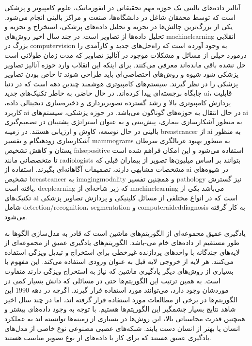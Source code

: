 آنالیز داده‌های بالینی یک حوزه مهم تحقیقاتی در انفورماتیک، علوم کامپیوتر و پزشکی است که توسط محققان شاغل در دانشگاه‌ها، صنعت و مراکز بالینی انجام می‌شود. یکی از بزرگ‌ترین چالش‌ها در تجزیه و تحلیل داده‌های پزشکی، استخراج و تجزیه و تحلیل داده‌ها از تصاویر است. در چند سال اخیر روش‌های \gls{machinelearning} انقلابی بزرگ در \gls{computervision} به وجود آورده است که راه‌حل‌های جدید و کارآمدی را درمورد خیلی از مسائل و مشکلات موجود در آنالیز تصاویر که مدت زمان طولانی است حل نشده باقی مانده‌اند معرفی می‌کنند. برای اینکه این انقلاب وارد حوزه آنالیز تصاویر پزشکی شود شیوه و روش‌های اختصاصی‌ای باید طراحی شوند تا خاص بودن تصاویر پزشکی را در نظر گیرند. سیستم‌های کامپیوتری هوشمند چندین دهه است که در دنیا جایگاه برجسته‌ای پیدا کرده‌اند. در حال حاضر، به خاطر تکنیک‌های جدید \gls{ai}، قابلیت پردازش کامپیوتری بالا و رشد گسترده تصویربرداری و ذخیره‌سازی دیجیتالی داده، کاربرد \gls{ai} در حال انتقال به حوزه‌های گوناگون می‌باشد. در حوزه پزشکی، سیستم‌های \gls{ai} به منظور آشکارسازی بیماری، پیش‌بینی و به عنوان استراتژی پشتیبان در تصمیم‌گیری بالینی در حال توسعه، کاوش و ارزیابی هستند. در زمینه \gls{breastcancer} از \gls{ai} به منظور آشکارسازی زودهنگام و تفسیر \glspl{mammogram} به منظور بهبود غربالگری سرطان پستان و کاهش تشخیص \gls{falsepositive} استفاده می‌شود و این امکان فراهم شده است تا متخصصانی مانند \glspl{radiologist} بتوانند بر اساس میلیون‌ها تصویر از بیماران قبلی که مشخصات مشابهی دارند، تصمیمات آگاهانه‌ای بگیرند. استفاده از \gls{ai} در شیوه‌های تشخیص \gls{breastcancer} به \gls{imagingmodality} و همچنین تفسیر \gls{pathology} نیز گسترش یافته است. \gls{deeplearning} که زیر شاخه‌ای از \gls{machinelearning} می‌باشد یکی از تکنیک‌های \gls{ai} است که در انواع مختلفی از مسائل کلینیکی و پردازش تصاویر پزشکی شامل \gls{detection}/\gls{recognition}، \gls{segmentation} و \gls{computeraideddiagnosis} به کار گرفته می‌شود.

یادگیری عمیق مجموعه‌ای از الگوریتم‌های ماشین است که قادر به مدل‌سازی الگوها به طور مستقیم از داده‌های خام می-باشد. الگوریتم‌های یادگیری عمیق از مجموعه‌ای از لایه‌های چندگانه با واحدهای پردازنده غیرخطی برای استخراج و تبدیل ویژگی استفاده می‌کنند. هر لایه از خروجی لایه قبل به عنوان ورودی استفاده می‌کند. این مفهوم با بسیاری از روش‌های دیگر یادگیری ماشین که نیاز به استخراج ویژگی دارند متفاوت است. به همین ترتیب این الگوریتم‌ها حتی در مسائلی که دانش بسیار کمی در موردشان وجود دارد، می‌توانند مورد استفاده قرار گیرند. اگرچه در دهه 1990 این الگوریتم‌ها در برخی از مطالعات مورد استفاده قرار گرفته اند، اما در چند سال اخیر شاهد نتایج بسیار چشمگیر این الگوریتم‌ها هستیم. با توجه به وجود داده‌های بیشتر و همچنین قدرت محاسباتی بالا، این روش‌ها در بسیاری از زمینه‌ها توانسته اند به عملکرد انسان یا بهتر از انسان دست یابند\cite{akselrod2017deep}. شبکه‌های عصبی مصنوعی  نوع خاصی از مدل‌های یادگیری عمیق هستند که برای کار با داده‌های از نوع تصویر مناسب هستند.

